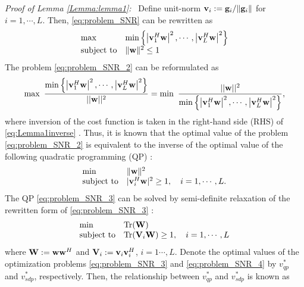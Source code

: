 \documentclass[11pt, draft, onecolumn ]{IEEEtran}
\begin{document}
{\it Proof of Lemma  \ref{Lemma:lemma1}:} ~Define unit-norm ${\bf v}_i := {\bf g}_i / \|{\bf g}_i\|$ for $ i = 1,\cdots, L$. Then, \eqref{eq:problem_SNR} can be rewritten as
\begin{equation} \label{eq:problem_SNR_2}
    \begin{array}{ll}
      \max & \min{\left\{ \left| {\bf v}_1^H {\bf w}\right|^2, \cdots, \left| {\bf v}_L^H {\bf w}\right|^2\right\}} \\
      \mathrm{subject ~ to} & \|{\bf w}\|^2 \leq 1
    \end{array}
\end{equation}
The problem \eqref{eq:problem_SNR_2} can be reformulated as
\begin{equation}  \label{eq:Lemma1inverse}
\max ~ \frac{\min{\left\{ \left| {\bf v}_1^H {\bf w}\right|^2, \cdots, \left| {\bf v}_L^H {\bf w}\right|^2\right\}}}{||{\bf w}||^2} =  \min ~ \frac{||{\bf w}||^2}{\min{\left\{ \left| {\bf v}_1^H {\bf w}\right|^2, \cdots, \left| {\bf v}_L^H {\bf w}\right|^2\right\}}},
\end{equation}
where inversion of the cost function is taken in the right-hand side (RHS) of \eqref{eq:Lemma1inverse} . Thus,
it is known that the optimal value of the problem \eqref{eq:problem_SNR_2} is equivalent to the inverse of the optimal value of the following quadratic programming (QP) \cite{Sidiropoulos:06TSP}:
\begin{equation} \label{eq:problem_SNR_3}
    \begin{array}{ll}
      \min & \|{\bf w}\|^2 \\
      \mathrm{subject ~ to} & |{\bf v}_i^H {\bf w}|^2 \geq 1, \quad i = 1,\cdots, L.
    \end{array}
\end{equation}
The QP \eqref{eq:problem_SNR_3} can be solved by semi-definite relaxation of the rewritten form of \eqref{eq:problem_SNR_3}  \cite{Sidiropoulos:06TSP}:
\begin{equation}   \label{eq:problem_SNR_4}
    \begin{array}{ll}
      \min & \mathrm{Tr}({\bf W}) \\
      \mathrm{subject ~ to} & \mathrm{Tr}({\bf V}_i {\bf W}) \geq 1, \quad i = 1,\cdots, L
    \end{array}
\end{equation}
where ${\bf W} := {\bf w} {\bf w}^H$ and ${\bf V}_i := {\bf v}_i{\bf v}_i^H$, $i = 1\cdots, L$.
Denote the optimal values of the optimization problems \eqref{eq:problem_SNR_3} and \eqref{eq:problem_SNR_4} by
$v_{qp}^*$ and $v_{sdp}^*$, respectively. Then, the relationship between $v_{qp}^*$ and $v_{sdp}^*$ is known as \cite{Luo:07JO}
\end{document}
